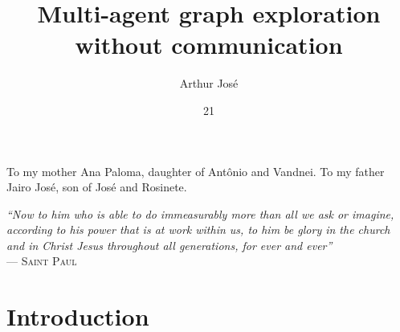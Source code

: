 \documentclass[tg, eng]{ita}    %
\author{Arthur Jos\'{e}}{de Sousa Rodrigues}
\title{Multi-agent graph exploration without communication}
\date{21}{November}{2023}
\begin{document}
\maketitle

\begin{itadedication}
To my mother Ana Paloma, daughter of Ant\^{o}nio and Vandnei. To my father Jairo Jos\'e, son of Jos\'e and Rosinete.
\end{itadedication}

\begin{itathanks}

\end{itathanks}

\thispagestyle{empty}
\ifhyperref{}\fi
\begin{flushright}
\begin{spacing}{1}
\mbox{}\vfill
{\sffamily\itshape
``Now to him who is able to do immeasurably more than all we ask or imagine, according to his power that is at work within us, to him be glory in the church and in Christ Jesus throughout all generations, for ever and ever''\\}
--- \textsc{Saint Paul}
\end{spacing}
\end{flushright}

\begin{abstract}
\noindent

\end{abstract}

\begin{englishabstract}
\noindent

\end{englishabstract}

\listoffigures %


\listofalgorithms

\listofabbreviations


\tableofcontents

\mainmatter

\chapter{Introduction}

\end{document}
